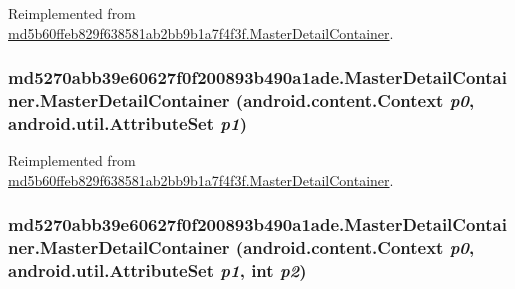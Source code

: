 Reimplemented from \hyperlink{classmd5b60ffeb829f638581ab2bb9b1a7f4f3f_1_1_master_detail_container_1af6b6d44bea0fd2817369e2e442b274}{md5b60ffeb829f638581ab2bb9b1a7f4f3f.MasterDetailContainer}.\hypertarget{classmd5270abb39e60627f0f200893b490a1ade_1_1_master_detail_container_c1707155566739333160760c52523d93}{
\subsubsection[{MasterDetailContainer}]{\setlength{\rightskip}{0pt plus 5cm}md5270abb39e60627f0f200893b490a1ade.MasterDetailContainer.MasterDetailContainer (android.content.Context {\em p0}, \/  android.util.AttributeSet {\em p1})}}
\label{classmd5270abb39e60627f0f200893b490a1ade_1_1_master_detail_container_c1707155566739333160760c52523d93}




Reimplemented from \hyperlink{classmd5b60ffeb829f638581ab2bb9b1a7f4f3f_1_1_master_detail_container_c9b0445081c2aabb67adc98d6b8c9ca1}{md5b60ffeb829f638581ab2bb9b1a7f4f3f.MasterDetailContainer}.\hypertarget{classmd5270abb39e60627f0f200893b490a1ade_1_1_master_detail_container_fe89442bed68567e1df7fa008310532a}{
\subsubsection[{MasterDetailContainer}]{\setlength{\rightskip}{0pt plus 5cm}md5270abb39e60627f0f200893b490a1ade.MasterDetailContainer.MasterDetailContainer (android.content.Context {\em p0}, \/  android.util.AttributeSet {\em p1}, \/  int {\em p2})}}
\label{classmd5270abb39e60627f0f200893b490a1ade_1_1_master_detail_container_fe89442bed68567e1df7fa008310532a}




